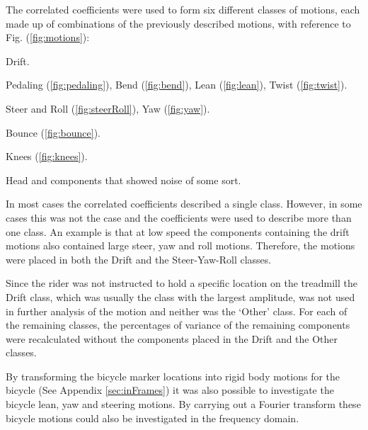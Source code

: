 The correlated coefficients were used to form six different classes of motions,
each made up of combinations of the previously described motions, with
reference to Fig. (\ref{fig:motions}):
\begin{description}
    \item[Drift] Drift.
    \item[Pedaling] Pedaling (\ref{fig:pedaling}), Bend (\ref{fig:bend}), Lean (\ref{fig:lean}), Twist (\ref{fig:twist}).
    \item[Steer-Yaw-Roll] Steer and Roll (\ref{fig:steerRoll}), Yaw (\ref{fig:yaw}).
    \item[Bounce] Bounce (\ref{fig:bounce}).
    \item[Knees] Knees (\ref{fig:knees}).
    \item[Others] Head and components that showed noise of some
    sort.
\end{description}

In most cases the correlated coefficients described a single class. However, in
some cases this was not the case and the coefficients were used to describe
more than one class. An example is that at low speed the components containing
the drift motions also contained large steer, yaw and roll motions. Therefore,
the motions were placed in both the Drift and the Steer-Yaw-Roll classes.

Since the rider was not instructed to hold a specific location on the treadmill
the Drift class, which was usually the class with the largest amplitude, was
not used in further analysis of the motion and neither was the `Other' class.
For each of the remaining classes, the percentages of variance of the remaining
components were recalculated without the components placed in the Drift and the
Other classes.

By transforming the bicycle marker locations into rigid body motions for the
bicycle (See Appendix \ref{sec:inFrames}) it was also possible to investigate
the bicycle lean, yaw and steering motions. By carrying out a Fourier transform
these bicycle motions could also be investigated in the frequency domain.

